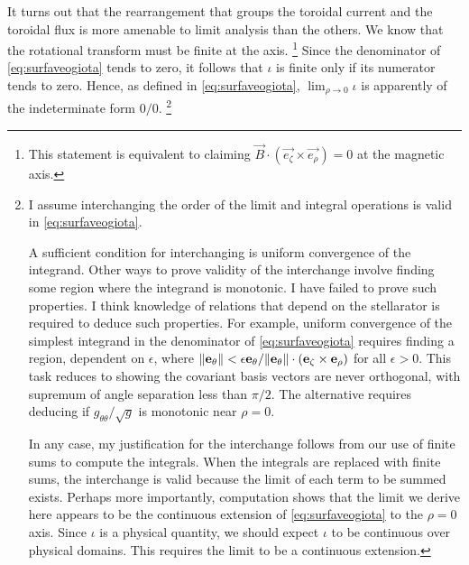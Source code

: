 It turns out that the rearrangement that groups the toroidal current and the toroidal flux is more amenable to limit analysis than the others.
We know that the rotational transform must be finite at the axis.%
\footnote{This statement is equivalent to claiming \(\vec{B} \cdot (\vec{e_{\zeta}} \times \vec{e_{\rho}}) = 0\) at the magnetic axis.}
Since the denominator of \eqref{eq:surfaveogiota} tends to zero, it follows that \(\iota\) is finite only if its numerator tends to zero.
Hence, as defined in \eqref{eq:surfaveogiota}, \(\lim_{\rho \to 0} \iota\) is apparently of the indeterminate form \(0 / 0\).%
\footnote{%
	I assume interchanging the order of the limit and integral operations is valid in \eqref{eq:surfaveogiota}.

	A sufficient condition for interchanging is uniform convergence of the integrand.
	Other ways to prove validity of the interchange involve finding some region where the integrand is monotonic.
	I have failed to prove such properties.
	I think knowledge of relations that depend on the stellarator is required to deduce such properties.
	For example, uniform convergence of the simplest integrand in the denominator of \eqref{eq:surfaveogiota} requires finding a region, dependent on \(\epsilon\), where \(\lVert\mathbf{e_{\theta}}\rVert < \epsilon \mathbf{e_{\theta}} / \lVert\mathbf{e_{\theta}}\rVert \cdot \lparen\mathbf{e_{\zeta}} \times \mathbf{e_{\rho}}\rparen\) for all \(\epsilon > 0\).
	This task reduces to showing the covariant basis vectors are never orthogonal, with supremum of angle separation less than \(\pi / 2\).
	The alternative requires deducing if \(g_{\theta \theta} / \sqrt{g}\) is monotonic near \(\rho=0\).

	In any case, my justification for the interchange follows from our use of finite sums to compute the integrals.
	When the integrals are replaced with finite sums, the interchange is valid because the limit of each term to be summed exists.
	Perhaps more importantly, computation shows that the limit we derive here appears to be the continuous extension of \eqref{eq:surfaveogiota} to the \(\rho = 0\) axis.
	Since \(\iota\) is a physical quantity, we should expect \(\iota\) to be continuous over physical domains.
	This requires the limit to be a continuous extension.
}


